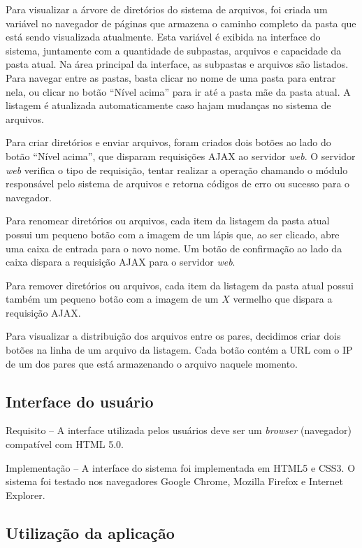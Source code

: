 \documentclass{article}
\begin{document}
Para visualizar a árvore de diretórios do sistema de arquivos, foi criada um variável no navegador de páginas que armazena o caminho completo da pasta que está sendo visualizada atualmente. Esta variável é exibida na interface do sistema, juntamente com a quantidade de subpastas, arquivos e capacidade da pasta atual. Na área principal da interface, as subpastas e arquivos são listados. Para navegar entre as pastas, basta clicar no nome de uma pasta para entrar nela, ou clicar no botão ``Nível acima'' para ir até a pasta mãe da pasta atual. A listagem é atualizada automaticamente caso hajam mudanças no sistema de arquivos.

Para criar diretórios e enviar arquivos, foram criados dois botões ao lado do botão ``Nível acima'', que disparam requisições AJAX ao servidor \textit{web}. O servidor \textit{web} verifica o tipo de requisição, tentar realizar a operação chamando o módulo responsável pelo sistema de arquivos e retorna códigos de erro ou sucesso para o navegador.

Para renomear diretórios ou arquivos, cada item da listagem da pasta atual possui um pequeno botão com a imagem de um lápis que, ao ser clicado, abre uma caixa de entrada para o novo nome. Um botão de confirmação ao lado da caixa dispara a requisição AJAX para o servidor \textit{web}.

Para remover diretórios ou arquivos, cada item da listagem da pasta atual possui também um pequeno botão com a imagem de um $X$ vermelho que dispara a requisição AJAX.

Para visualizar a distribuição dos arquivos entre os pares, decidimos criar dois botões na linha de um arquivo da listagem. Cada botão contém a URL com o IP de um dos pares que está armazenando o arquivo naquele momento.

\subsection{Interface do usuário}

\indent

Requisito -- A interface utilizada pelos usuários deve ser um \textit{browser} (navegador) compatível com HTML 5.0.

Implementação -- A interface do sistema foi implementada em HTML5 e CSS3. O sistema foi testado nos navegadores Google Chrome, Mozilla Firefox e Internet Explorer.

\subsection{Utilização da aplicação}
\end{document}
